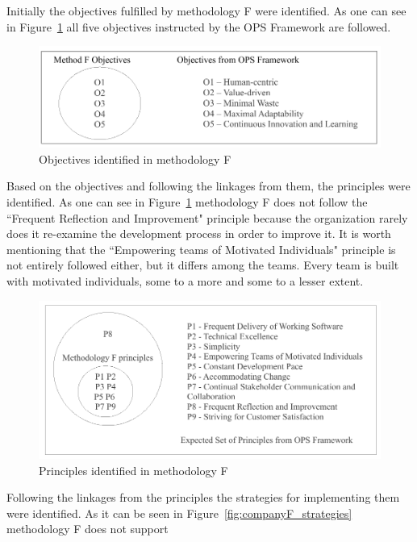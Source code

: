 Initially the objectives fulfilled by methodology F were identified. As one can see in Figure~\ref{fig:companyF_objectives} all five objectives instructed by the OPS Framework are followed.

\begin{figure}[H]
\centerline{\includegraphics[scale=0.9]{include/case_study/fig/companyF_objectives.pdf}}
\caption{Objectives identified in methodology F} 
\label{fig:companyF_objectives}
\end{figure}

Based on the objectives and following the linkages from them, the principles were identified. As one can see in Figure~\ref{fig:companyF_objectives} methodology F does not follow the ``Frequent Reflection and Improvement" principle because the organization rarely does it re-examine the development process in order to improve it. %
It is worth mentioning that the ``Empowering teams of Motivated Individuals" principle is not entirely followed either, but it differs among the teams. Every team is built with motivated individuals, some to a more and some to a lesser extent. 

\begin{figure}[H]
\centerline{\includegraphics[scale=0.9]{include/case_study/fig/companyF_principles.pdf}}
\caption{Principles identified in methodology F} 
\label{fig:companyF_principles}
\end{figure}

Following the linkages from the principles the strategies for implementing them were identified. As it can be seen in Figure~\ref{fig:companyF_strategies} methodology F does not support 

